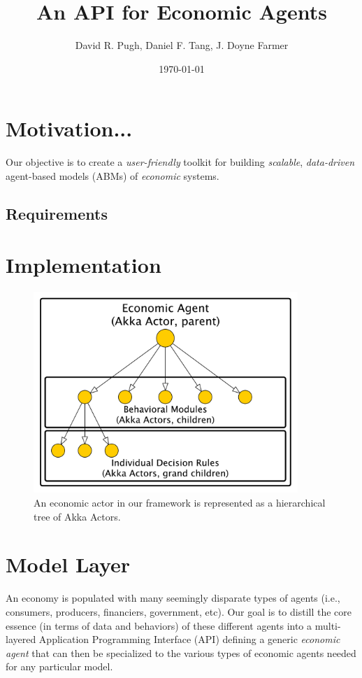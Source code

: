 \documentclass[11pt]{amsart}
\title{An API for Economic Agents}
\author{David R. Pugh, Daniel F. Tang, J. Doyne Farmer}
\date{\today}
\begin{document}
\maketitle

\section{Motivation...}
Our objective is to create a \textit{user-friendly} toolkit for building \textit{scalable}, \textit{data-driven} agent-based models (ABMs) of \textit{economic} systems.

\subsection{Requirements}

\section{Implementation}
\begin{figure}[H]
\centering
\includegraphics[width=10cm]{hierarchical-actor.pdf}
\caption{An economic actor in our framework is represented as a hierarchical tree of Akka Actors.}
\end{figure}

\section{Model Layer}
An economy is populated with many seemingly disparate types of agents (i.e., consumers, producers, financiers, government, etc).  Our goal is to distill the core essence (in terms of data and behaviors) of these different agents into a multi-layered Application Programming Interface (API) defining a generic \textit{economic agent} that can then be specialized to the various types of economic agents needed for any particular model.
\end{document}
